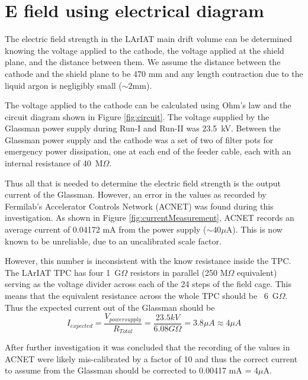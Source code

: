 \clearpage
\newpage
\section{E field using electrical diagram}\label{sec:elDiagram}
The electric field strength in the LArIAT main drift volume can be determined knowing the voltage applied to the cathode, the voltage applied at the shield plane, and the distance between them. We assume the distance between the cathode and the shield plane to be 470 mm and any length contraction due to the liquid argon is negligibly small ($\sim 2$mm).

The voltage applied to the cathode can be calculated using Ohm's law and the circuit diagram shown in Figure \ref{fig:circuit}. The voltage supplied by the Glassman power supply during Run-I and Run-II was 23.5~kV. Between the Glassman power supply and the cathode was a set of two of filter pots for emergency power dissipation, one at each end of the feeder cable, each with an internal resistance of 40~M$\Omega$. 

Thus all that is needed to determine the electric field strength is the output current of the Glassman. However, an error in the values as recorded by Fermilab's Accelerator Controls Network (ACNET) was found during this investigation. As shown in Figure \ref{fig:currentMeasurement}, ACNET records an average current of 0.04172 mA from the power supply ($\sim$40$\mu$A).  This is now known to be unreliable, due to an uncalibrated scale factor. 

However, this number is inconsistent with the know resistance inside the TPC. The LArIAT TPC has four 1~G$\Omega$ resistors in parallel (250 M$\Omega$ equivalent) serving as the voltage divider across each of the 24 steps of the field cage. This means that the equivalent resistance across the whole TPC should be ~6~G$\Omega$. Thus the expected current out of the Glassman should be 
\begin{equation}
I_{expected} = \frac{V_{power supply}}{R_{Total}} = \frac{23.5 kV}{6.08 G\Omega} = 3.8 \mu A \approx 4 \mu A
\end{equation}

After further investigation it was concluded that the recording of the values in ACNET were likely mis-calibrated by a factor of 10 and thus the correct current to assume from the Glassman should be corrected to 0.00417 mA = 4$\mu$A.

